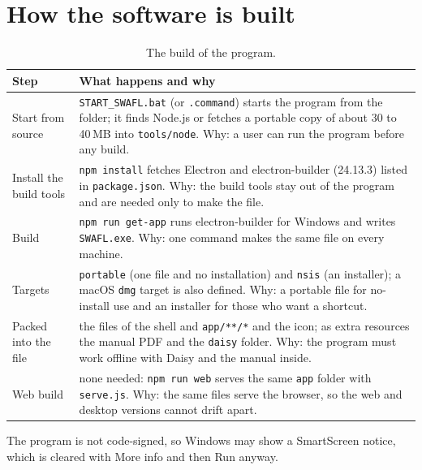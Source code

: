 \section{How the software is built}
\begin{table}[H]\centering\small
\caption{The build of the program.}\label{tab:build}
\begin{tabular}{@{}>{\raggedright\arraybackslash}p{3.7cm}>{\raggedright\arraybackslash}p{9.3cm}@{}}
\toprule Step & What happens and why\\\midrule
Start from source & \texttt{START\_SWAFL.bat} (or \texttt{.command}) starts the program from the folder; it finds Node.js or fetches a portable copy of about 30 to 40\,MB into \texttt{tools/node}. Why: a user can run the program before any build.\\
Install the build tools & \texttt{npm install} fetches Electron and electron-builder (24.13.3) listed in \texttt{package.json}. Why: the build tools stay out of the program and are needed only to make the file.\\
Build & \texttt{npm run get-app} runs electron-builder for Windows and writes \texttt{SWAFL.exe}. Why: one command makes the same file on every machine.\\
Targets & \texttt{portable} (one file and no installation) and \texttt{nsis} (an installer); a macOS \texttt{dmg} target is also defined. Why: a portable file for no-install use and an installer for those who want a shortcut.\\
Packed into the file & the files of the shell and \texttt{app/**/*} and the icon; as extra resources the manual PDF and the \texttt{daisy} folder. Why: the program must work offline with Daisy and the manual inside.\\
Web build & none needed: \texttt{npm run web} serves the same \texttt{app} folder with \texttt{serve.js}. Why: the same files serve the browser, so the web and desktop versions cannot drift apart.\\
\bottomrule\end{tabular}\end{table}
The program is not code-signed, so Windows may show a SmartScreen notice, which is cleared with More info and then Run anyway.

